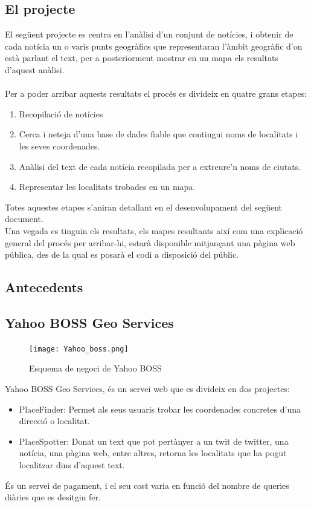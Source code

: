 \documentclass[12pt,a4paper,openright,oneside]{article}
\numberwithin{equation}{section}
\theoremstyle{definition}
\begin{document}
\subsection{El projecte}

El següent projecte es centra en l'anàlisi d'un conjunt de notícies, i obtenir de cada notícia un o varis punts geogràfics que representaran l'àmbit geogràfic d'on està parlant el text, per a posteriorment mostrar en un mapa els resultats d'aquest anàlisi.\\ \\
Per a poder arribar aquests resultats el procés es divideix en quatre grans etapes:
\begin{enumerate}
\item Recopilació de notícies
\item Cerca i neteja d'una base de dades fiable que contingui noms de localitats i les seves coordenades.
\item Anàlisi del text de cada notícia recopilada per a extreure'n noms de ciutats.
\item Representar les localitats trobades en un mapa.
\end{enumerate}

Totes aquestes etapes s'aniran detallant en el desenvolupament del següent document.\\
Una vegada es tinguin els resultats, els mapes resultants així com una explicació general del procés per arribar-hi, estarà disponible mitjançant una pàgina web pública, des de la qual es posarà el codi a disposició del públic.

\subsection{Antecedents}
\subsection*{Yahoo BOSS Geo Services}

\begin{figure}[htbp]
\centering
\texttt{[image: Yahoo\_boss.png]}
\caption{Esquema de negoci de Yahoo BOSS}
\end{figure}
Yahoo BOSS Geo Services, és un servei web que es divideix en dos projectes:
\begin{itemize}
\item PlaceFinder: Permet als seus usuaris trobar les coordenades concretes d'una direcció o localitat.
\item PlaceSpotter: Donat un text que pot pertànyer a un twit de twitter, una notícia, una pàgina web, entre altres, retorna les localitats que ha pogut localitzar dins d'aquest text.
\end{itemize}
És un servei de pagament, i el seu cost varia en funció del nombre de queries diàries que es desitgin fer.
\end{document}
